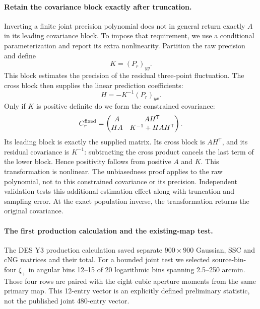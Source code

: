 \paragraph{Retain the covariance block exactly after truncation.}
Inverting a finite joint precision polynomial does not in general return
exactly $A$ in its leading covariance block. To impose that requirement,
we use a conditional parameterization and report its extra nonlinearity.
Partition the raw precision and define
\begin{equation}
 K=(P_r)_{yy}.
\end{equation}
This block estimates the precision of the residual three-point fluctuation.
The cross block then supplies the linear prediction coefficients:
\begin{equation}
 H=-K^{-1}(P_r)_{yx}.
\end{equation}
Only if $K$ is positive definite do we form the constrained covariance:
\begin{equation}
 C_r^{\rm fixed}=\begin{pmatrix}A&AH^{\mathsf T}\\HA&K^{-1}+HAH^{\mathsf T}\end{pmatrix}.
\end{equation}
Its leading block is exactly the supplied matrix. Its cross block is
$AH^{\mathsf T}$, and its residual covariance is $K^{-1}$: subtracting the
cross product cancels the last term of the lower block. Hence positivity
follows from positive $A$ and $K$. This transformation is nonlinear. The
unbiasedness proof applies to the raw polynomial, not to this constrained
covariance or its precision. Independent validation tests this additional
estimation effect along with truncation and sampling error. At the exact
population inverse, the transformation returns the original covariance.

\paragraph{The first production calculation and the existing-map test.}
The DES Y3 production calculation saved separate $900\times900$ Gaussian,
SSC and cNG matrices and their total. For a bounded
joint test we selected source-bin-four $\xi_+$ in angular bins 12--15 of
20 logarithmic bins spanning 2.5--250 arcmin. Those four rows are paired
with the eight cubic aperture moments from the same primary map. This
12-entry vector is an explicitly defined preliminary statistic, not the
published joint 480-entry vector.


